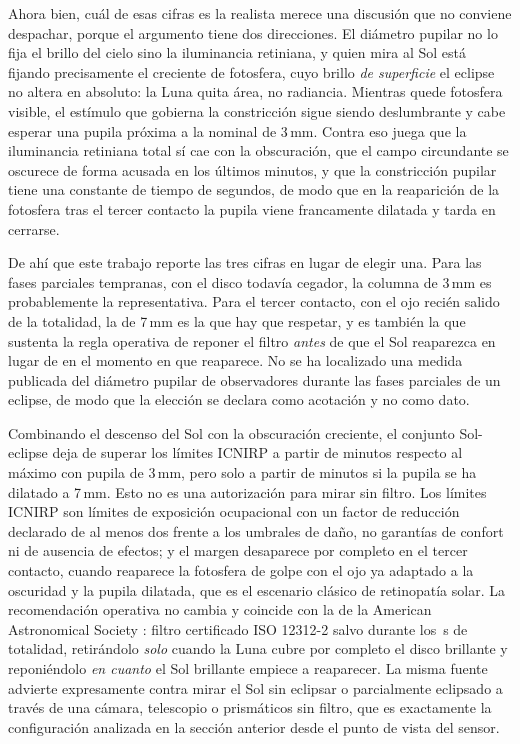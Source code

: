 \documentclass[10pt,a4paper]{article}
\begin{document}
Ahora bien, cuál de esas cifras es la realista merece una discusión que no
conviene despachar, porque el argumento tiene dos direcciones. El diámetro
pupilar no lo fija el brillo del cielo sino la iluminancia retiniana, y quien
mira al Sol está fijando precisamente el creciente de fotosfera, cuyo brillo
\emph{de superficie} el eclipse no altera en absoluto: la Luna quita área, no
radiancia. Mientras quede fotosfera visible, el estímulo que gobierna la
constricción sigue siendo deslumbrante y cabe esperar una pupila próxima a la
nominal de 3\,mm. Contra eso juega que la iluminancia retiniana total sí cae con
la obscuración, que el campo circundante se oscurece de forma acusada en los
últimos minutos, y que la constricción pupilar tiene una constante de tiempo de
segundos, de modo que en la reaparición de la fotosfera tras el tercer contacto
la pupila viene francamente dilatada y tarda en cerrarse.

De ahí que este trabajo reporte las tres cifras en lugar de elegir una. Para las
fases parciales tempranas, con el disco todavía cegador, la columna de 3\,mm es
probablemente la representativa. Para el tercer contacto, con el ojo recién
salido de la totalidad, la de 7\,mm es la que hay que respetar, y es también la
que sustenta la regla operativa de reponer el filtro \emph{antes} de que el Sol
reaparezca en lugar de en el momento en que reaparece. No se ha localizado una
medida publicada del diámetro pupilar de observadores durante las fases
parciales de un eclipse, de modo que la elección se declara como acotación y no
como dato.

Combinando el descenso del Sol con la obscuración creciente, el conjunto
Sol-eclipse deja de superar los límites ICNIRP a partir de \unlimitedFromPThree{} minutos respecto al máximo con
pupila de 3\,mm, pero solo a partir de \unlimitedFromPSeven{} minutos si la
pupila se ha dilatado a 7\,mm. Esto no es una autorización para mirar sin filtro. Los límites
ICNIRP son límites de exposición ocupacional con un factor de reducción
declarado de al menos dos frente a los umbrales de daño, no garantías de
confort ni de ausencia de efectos; y el margen desaparece por completo en el
tercer contacto, cuando reaparece la fotosfera de golpe con el ojo ya adaptado a
la oscuridad y la pupila dilatada, que es el escenario clásico de retinopatía
solar. La recomendación operativa no cambia y coincide con la de la American
Astronomical Society \cite{aas}: filtro certificado ISO 12312-2 salvo durante
los \totalityDur\,s de totalidad, retirándolo \emph{solo} cuando la Luna cubre
por completo el disco brillante y reponiéndolo \emph{en cuanto} el Sol brillante
empiece a reaparecer. La misma fuente advierte expresamente contra mirar el Sol
sin eclipsar o parcialmente eclipsado a través de una cámara, telescopio o
prismáticos sin filtro, que es exactamente la configuración analizada en la
sección anterior desde el punto de vista del sensor.
\end{document}
